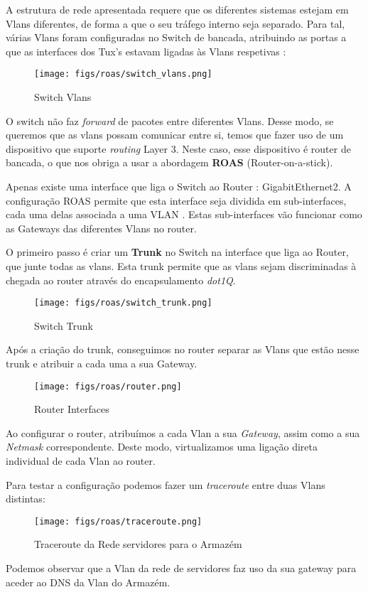 A estrutura de rede apresentada requere que os diferentes sistemas estejam em Vlans diferentes, de forma a que o seu tráfego interno seja separado.
Para tal, várias Vlans foram configuradas no Switch de bancada, atribuindo as portas a que as interfaces dos Tux's estavam ligadas às Vlans respetivas \cite{vlan}:

\begin{figure}[H]
    \centering
    \texttt{[image: figs/roas/switch\_vlans.png]}
    \caption{Switch Vlans}
    \label{fig:switch_vlans}
\end{figure}

O switch não faz \textit{forward} de pacotes entre diferentes Vlans.
Desse modo, se queremos que as vlans possam comunicar entre si, temos que fazer uso de um dispositivo que suporte \textit{routing }Layer 3.
Neste caso, esse dispositivo é router de bancada, o que nos obriga a usar a abordagem \textbf{ROAS} (Router-on-a-stick).

Apenas existe uma interface que liga o Switch ao Router : GigabitEthernet2.
A configuração ROAS permite que esta interface seja dividida em sub-interfaces, cada uma delas associada a uma VLAN \cite{encapsulation}.
Estas sub-interfaces vão funcionar como as Gateways das diferentes Vlans no router.

O primeiro passo é criar um \textbf{Trunk} no Switch na interface que liga ao Router, que junte todas as vlans.
Esta trunk permite que as vlans sejam discriminadas à chegada ao router através do encapsulamento \textit{dot1Q}.

\begin{figure}[H]
    \centering
    \texttt{[image: figs/roas/switch\_trunk.png]}
    \caption{Switch Trunk}
    \label{fig:switch_trunk}
\end{figure}

\clearpage

Após a criação do trunk, conseguimos no router separar as Vlans que estão nesse trunk e atribuir a cada uma a sua Gateway.

\begin{figure}[H]
    \centering
    \texttt{[image: figs/roas/router.png]}
    \caption{Router Interfaces}
    \label{fig:router_interfaces}
\end{figure}

Ao configurar o router, atribuímos a cada Vlan a sua \textit{Gateway}, assim como a sua \textit{Netmask} correspondente.
Deste modo, virtualizamos uma ligação direta individual de cada Vlan ao router.

Para testar a configuração podemos fazer um \textit{traceroute} entre duas Vlans distintas:

\begin{figure}[H]
    \centering
    \texttt{[image: figs/roas/traceroute.png]}
    \caption{Traceroute da Rede servidores para o Armazém}
    \label{fig:traceroute}
\end{figure}

Podemos observar que a Vlan da rede de servidores faz uso da sua gateway para aceder ao DNS da Vlan do Armazém.